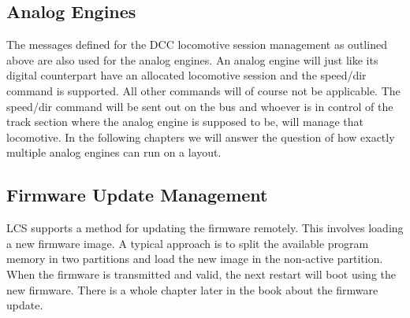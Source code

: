 \begin{table}[ht!]
    \centering 
    \caption{DCC Packet Error and Status}
\end{table}

\subsection{Analog Engines}

The messages defined for the DCC locomotive session management as outlined above are also used for the analog engines. An analog engine will just like its digital counterpart have an allocated locomotive session and the speed/dir command is supported. All other commands will of course not be applicable. The speed/dir command will be sent out on the bus and whoever is in control of the track section where the analog engine is supposed to be, will manage that locomotive. In the following chapters we will answer the question of how exactly multiple analog engines can run on a layout.

\subsection{Firmware Update Management}

LCS supports a method for updating the firmware remotely. This involves loading a new firmware image. A typical approach is to split the available program memory in two partitions and load the new image in the non-active partition. When the firmware is transmitted and valid, the next restart will boot using the new firmware. There is a whole chapter later in the book about the firmware update.

